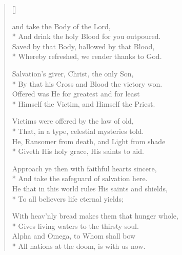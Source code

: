 \newHymn


\begin{verse}[\versewidth]

 and take the Body of the Lord,\\*
And drink the holy Blood for you outpoured.\\
Saved by that Body, hallowed by that Blood,\\*
Whereby refreshed, we render thanks to God.

Salvation's giver, Christ, the only Son,\\*
By that his Cross and Blood the victory won.\\
Offered was He for greatest and for least\\*
Himself the Victim, and Himself the Priest.

Victims were offered by the law of old,\\*
That, in a type, celestial mysteries told.\\
He, Ransomer from death, and Light from shade\\*
Giveth His holy grace, His saints to aid.

Approach ye then with faithful hearts sincere,\\*
And take the safeguard of salvation here.\\
He that in this world rules His saints and shields,\\*
To all believers life eternal yields;

With heav'nly bread makes them that hunger whole,\\*
Gives living waters to the thirsty soul.\\
Alpha and Omega, to Whom shall bow\\*
All nations at the doom, is with us now.

\end{verse}

\Hmeter{}

